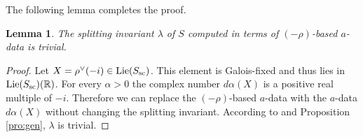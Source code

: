 \documentclass{article}
\newtheorem{lem}[thm]{Lemma}
\theoremstyle{definition}
\numberwithin{equation}{section}
\renewcommand{\-}{\hyp{}}
\begin{document}
The following lemma completes the proof.

\begin{lem} \label{lem:gen}
The splitting invariant $\lambda$ of $S$ computed in terms of $(-\rho)$-based $a$-data is trivial.
\end{lem}
\begin{proof}
Let $X=\rho^\vee(-i) \in \textrm{Lie}(S_{\textrm{sc}})$. This element is Galois-fixed and thus lies in $\textrm{Lie}(S_{\textrm{sc}})(\mathbb{R})$. For every $\alpha>0$ the complex number $d\alpha(X)$ is a positive real multiple of $-i$. Therefore we can replace the $(-\rho)$-based $a$-data with the $a$-data $d\alpha(X)$ without changing the splitting invariant. According to \cite[Theorem 5.1]{Kot99} and Proposition \ref{pro:gen}, $\lambda$ is trivial.
\end{proof}





%

\end{document}
